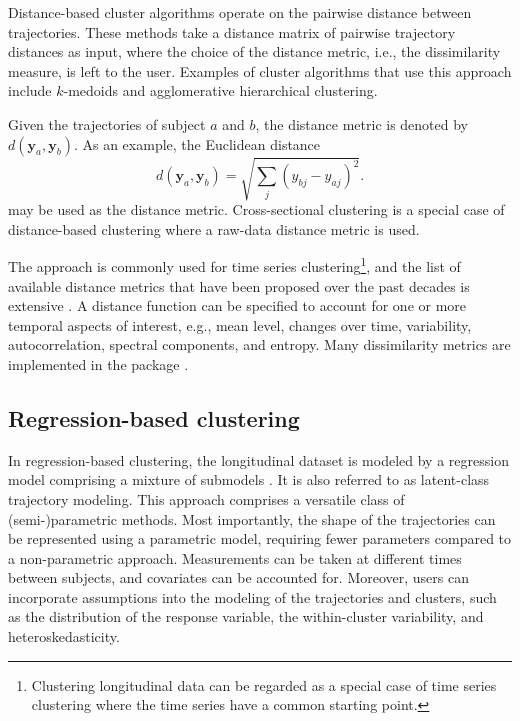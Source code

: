 Distance-based cluster algorithms operate on the pairwise distance between trajectories. These methods take a distance matrix of pairwise trajectory distances as input, where the choice of the distance metric, i.e., the dissimilarity measure, is left to the user. Examples of cluster algorithms that use this approach include \(k\)-medoids and agglomerative hierarchical clustering.

Given the trajectories of subject \(a\) and \(b\), the distance metric is denoted by \(d(\mathbf{y}_a, \mathbf{y}_b)\). As an example, the Euclidean distance \[d(\mathbf{y}_a, \mathbf{y}_b) = \sqrt{\sum_{j} (y_{bj} - y_{aj})^2}.\] may be used as the distance metric. Cross-sectional clustering is a special case of distance-based clustering where a raw-data distance metric is used.

The approach is commonly used for time series clustering\footnote{Clustering longitudinal data can be regarded as a special case of time series clustering where the time series have a common starting point.}, and the list of available distance metrics that have been proposed over the past decades is extensive \citep{aghabozorgi2015time}. A distance function can be specified to account for one or more temporal aspects of interest, e.g., mean level, changes over time, variability, autocorrelation, spectral components, and entropy. Many dissimilarity metrics are implemented in the  package \citep{sardaespinosa2019time}.

\subsection{Regression-based clustering}\label{regression-based-clustering}

In regression-based clustering, the longitudinal dataset is modeled by a regression model comprising a mixture of submodels \citep{de2008model}. It is also referred to as latent-class trajectory modeling. This approach comprises a versatile class of (semi-)parametric methods. Most importantly, the shape of the trajectories can be represented using a parametric model, requiring fewer parameters compared to a non-parametric approach. Measurements can be taken at different times between subjects, and covariates can be accounted for. Moreover, users can incorporate assumptions into the modeling of the trajectories and clusters, such as the distribution of the response variable, the within-cluster variability, and heteroskedasticity.

